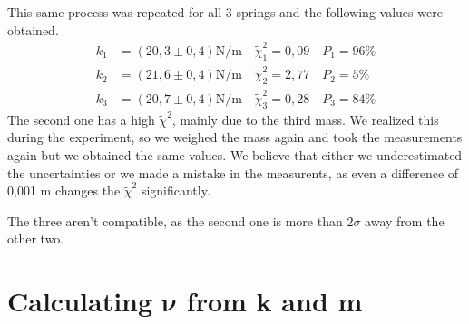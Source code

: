 \documentclass{article}
\begin{document}
This same process was repeated for all 3 springs and the following values were obtained.
\begin{align}
    k_1 &= (20,3 \pm 0,4) \text{N/m} \quad \tilde \chi_1^2 = 0,09 \quad P_1 = 96\% \\
    k_2 &= (21,6 \pm 0,4) \text{N/m} \quad \tilde \chi_2^2 = 2,77 \quad P_2 =  5\% \\
    k_3 &= (20,7 \pm 0,4) \text{N/m} \quad \tilde \chi_3^2 = 0,28 \quad P_3 = 84\%
\end{align}
The second one has a high $\tilde \chi^2$, mainly due to the third mass. We realized this during the experiment, so we weighed the mass again and took the measurements again but we obtained the same values. We believe that either we underestimated the uncertainties or we made a mistake in the measurents, as even a difference of 0,001 m changes the $\tilde \chi^2$ significantly.

The three aren't compatible, as the second one is more than $2 \sigma$ away from the other two. 

\section{Calculating $\bm \nu$ from k and m} \label{sec:nukm}
\end{document}
